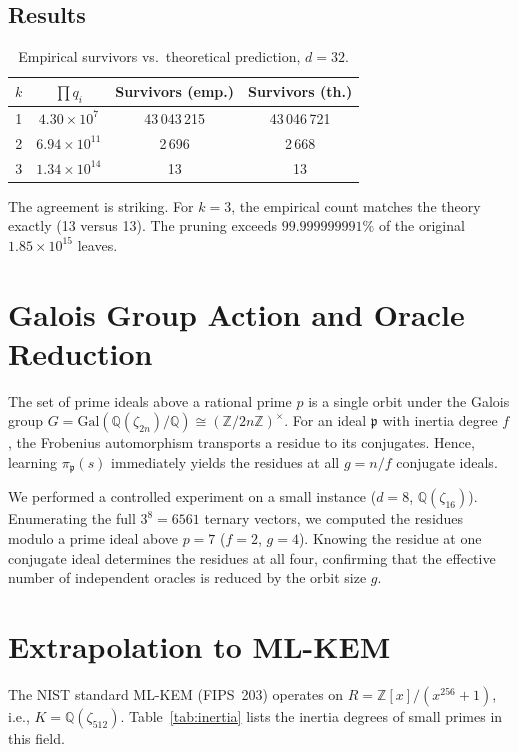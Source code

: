 \documentclass[12pt,a4paper]{article}
\begin{document}
\subsection{Results}
\begin{table}[ht]
\centering
\caption{Empirical survivors vs.\ theoretical prediction, $d=32$.}
\label{tab:results}
\begin{tabular}{c c c c}
\toprule
$k$ & $\prod q_i$ & Survivors (emp.) & Survivors (th.) \\
\midrule
1 & $4.30 \times 10^{7}$ & 43\,043\,215 & 43\,046\,721 \\
2 & $6.94 \times 10^{11}$ & 2\,696 & 2\,668 \\
3 & $1.34 \times 10^{14}$ & 13 & 13 \\
\bottomrule
\end{tabular}
\end{table}

The agreement is striking. For $k=3$, the empirical count matches the theory exactly (13 versus 13). The pruning exceeds $99.999999991\%$ of the original $1.85 \times 10^{15}$ leaves.

\section{Galois Group Action and Oracle Reduction}
\label{sec:galois}

The set of prime ideals above a rational prime $p$ is a single orbit under the Galois group $G = \mathrm{Gal}(\mathbb{Q}(\zeta_{2n})/\mathbb{Q}) \cong (\mathbb{Z}/2n\mathbb{Z})^\times$. For an ideal $\mathfrak{p}$ with inertia degree $f$, the Frobenius automorphism transports a residue to its conjugates. Hence, learning $\pi_{\mathfrak{p}}(s)$ immediately yields the residues at all $g = n/f$ conjugate ideals.

We performed a controlled experiment on a small instance ($d=8$, $\mathbb{Q}(\zeta_{16})$). Enumerating the full $3^8=6561$ ternary vectors, we computed the residues modulo a prime ideal above $p=7$ ($f=2$, $g=4$). Knowing the residue at one conjugate ideal determines the residues at all four, confirming that the effective number of independent oracles is reduced by the orbit size $g$.

\section{Extrapolation to ML-KEM}
\label{sec:mlkem}

The NIST standard ML-KEM (FIPS~203) operates on $R = \mathbb{Z}[x]/(x^{256}+1)$, i.e., $K = \mathbb{Q}(\zeta_{512})$. Table~\ref{tab:inertia} lists the inertia degrees of small primes in this field.
\end{document}
